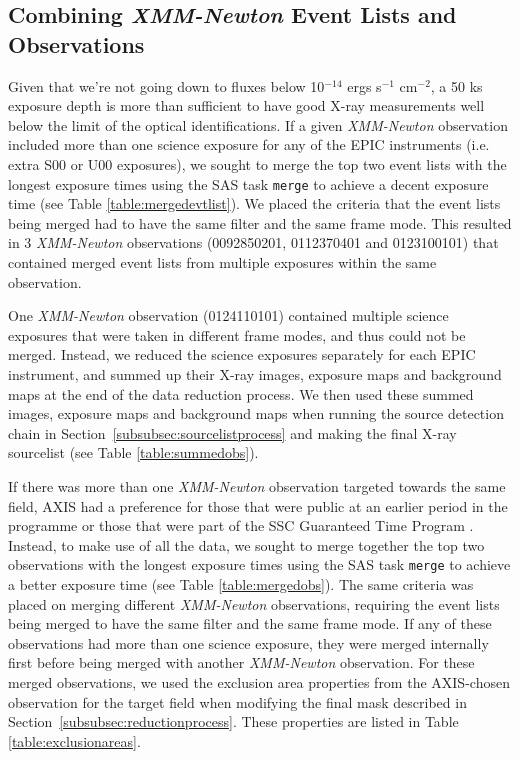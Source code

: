 \documentclass[fleqn,usenatbib]{mnras}
\begin{document}
    \subsection{Combining \textit{XMM-Newton} Event Lists and Observations}\label{subsec:merging}
	Given that we're not going down to fluxes below 10$^{-14}$ ergs s$^{-1}$ cm$^{-2}$, a 50 ks exposure depth is more than sufficient to have good X-ray measurements well below the limit of the optical identifications.
	If a given \textit{XMM-Newton} observation included more than one science exposure for any of the EPIC instruments (i.e. extra S00 or U00 exposures), we sought to merge the top two event lists with the longest exposure times using the SAS task \texttt{merge} to achieve a decent exposure time (see Table \ref{table:mergedevtlist}). 
	We placed the criteria that the event lists being merged had to have the same filter and the same frame mode.
	This resulted in 3 \textit{XMM-Newton} observations (0092850201, 0112370401 and 0123100101) that contained merged event lists from multiple exposures within the same observation.
	
	One \textit{XMM-Newton} observation (0124110101) contained multiple science exposures that were taken in different frame modes, and thus could not be merged.
	Instead, we reduced the science exposures separately for each EPIC instrument, and summed up their X-ray images, exposure maps and background maps at the end of the data reduction process.
	We then used these summed images, exposure maps and background maps when running the source detection chain in Section~\ref{subsubsec:sourcelistprocess} and making the final X-ray sourcelist (see Table \ref{table:summedobs}).
	
	If there was more than one \textit{XMM-Newton} observation targeted towards the same field, AXIS had a preference for those that were public at an earlier period in the programme or those that were part of the SSC Guaranteed Time Program \citep{carrera2007xmm}.
	Instead, to make use of all the data, we sought to merge together the top two observations with the longest exposure times using the SAS task \texttt{merge} to achieve a better exposure time (see Table \ref{table:mergedobs}).
	The same criteria was placed on merging different \textit{XMM-Newton} observations, requiring the event lists being merged to have the same filter and the same frame mode.
	If any of these observations had more than one science exposure, they were merged internally first before being merged with another \textit{XMM-Newton} observation.
	For these merged observations, we used the exclusion area properties from the AXIS-chosen observation for the target field when modifying the final mask described in Section~\ref{subsubsec:reductionprocess}.
    These properties are listed in Table \ref{table:exclusionareas}.
\end{document}
